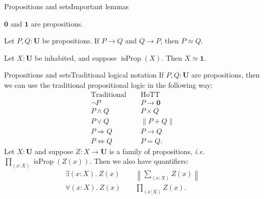 \documentclass{beamer}
\newcommand{\U}{\textbf{U}}
\newcommand{\tpi}[1]{\prod_{(#1)}}
\newcommand{\tsigma}[1]{\sum_{(#1)}}
\newcommand{\1}{\textbf{1}}
\newcommand{\0}{\mathbf{0}}
\newcommand{\2}{\textbf{2}}
\DeclareMathOperator{\isProp}{isProp}
\newcommand{\norm}[1][\cdot]{\left\|#1\right\|}
\begin{document}
\begin{frame}{Propositions and sets}{Important lemmas}
\begin{lem*}{} \( \0 \) and \( \1 \) are propositions. \end{lem*}\pause
\begin{lem*}{} Let \( P, Q : \U \) be propositions. If \( P \to Q \) and \( Q \to P \), then \( P \simeq Q \). \end{lem*}\pause
\begin{lem*}{} Let \( X : \U \) be inhabited, and suppose \( \isProp(X) \). Then \( X \simeq {\1} \). \end{lem*}
\end{frame}
\begin{frame}{Propositions and sets}{Traditional logical notation}
If \( P, Q : \U \) are propositions, then we can use the traditional propositional logic in the following way:
\[ \begin{array}{ccc}
	\text{Traditional} &\hspace{5pt}& \text{HoTT} \\ \hline
	\neg P && P \to \0 \\
	P \wedge Q && P \times Q \\
	P \vee Q && \norm[P + Q] \\
	P \Rightarrow Q && P \to Q \\
	P \Leftrightarrow Q && P = Q.
\end{array} \]
Let \( X : \U \) and suppose \( Z : X \to \U \) is a family of propositions, \emph{i.e.} \( \tpi{x : X} \isProp(Z(x)) \). Then we also have quantifiers:
\[ \begin{array}{ccc}
	\exists(x : X).~Z(x) &\hspace{5pt}& \norm[\tsigma{x : X} Z(x)] \\[3pt]
	\forall(x : X).~Z(x) && \tpi{x : X} Z(x).
\end{array} \]
\end{frame}
\end{document}
